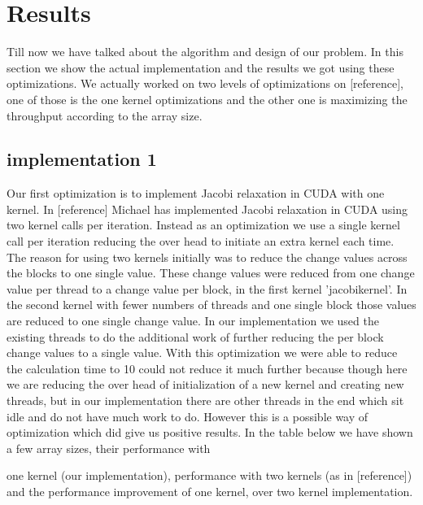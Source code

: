 \documentclass[11pt, twocolumn]{article}
\begin{document}
\section{Results} %
Till now we have talked about the algorithm and design of our problem. In this section we show the
actual implementation and the results we got using these optimizations. We actually worked on two
levels of optimizations on [reference], one of those is the one kernel optimizations and the other one is
maximizing the throughput according to the array size.
    \subsection{implementation 1}
    Our first optimization is to implement Jacobi relaxation in CUDA with one kernel. In [reference]
    Michael has implemented Jacobi relaxation in CUDA using two kernel calls per iteration. Instead as an
    optimization we use a single kernel call per iteration reducing the over head to initiate an extra kernel
    each time. The reason for using two kernels initially was to reduce the change values across the blocks
    to one single value. These change values were reduced from one change value per thread to a change
    value per block, in the first kernel 'jacobikernel'. In the second kernel with fewer numbers of threads
    and one single block those values are reduced to one single change value. In our implementation we
    used the existing threads to do the additional work of further reducing the per block change values to
    a single value. With this optimization we were able to reduce the calculation time to 10%
    could not reduce it much further because though here we are reducing the over head of initialization of
    a new kernel and creating new threads, but in our implementation there are other threads in the end
    which sit idle and do not have much work to do. However this is a possible way of optimization which
    did give us positive results. In the table below we have shown a few array sizes, their performance with

    one kernel (our implementation), performance with two kernels (as in [reference]) and the performance
    improvement of one kernel, over two kernel implementation.
\end{document}
